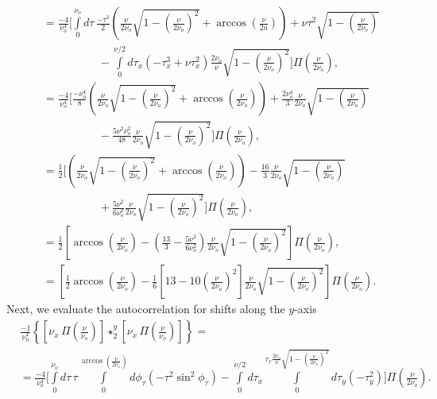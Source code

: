 \documentclass[11pt]{article}
\begin{document}
\begin{align}
  &=\frac{-4}{\nu_o^4}\Bigg[\int\limits_0^{\nu_o} d\tau\, \frac{-\tau^3}{2}\left(\frac{\nu}{2\nu_o}\sqrt{1 - \left(\frac{\nu}{2\nu_o}\right)^2} + \arccos\left(\frac{\nu}{2a}\right)\right) + \nu\tau^2\sqrt{1 - \left(\frac{\nu}{2\nu_o}\right)}\nonumber \\ &\hspace{5em}- \int\limits_0^{\nu/2}d\tau_x \left(-\tau_x^3 + \nu\tau_x^2\right)\frac{2 \nu_o}{\nu}\sqrt{1 - \left(\frac{\nu}{2\nu_o}\right)^2}\Bigg]\Pi\left(\frac{\nu}{2\nu_o}\right),\\
  &=  \frac{-4}{\nu_o^4}\Bigg[\frac{-\nu_o^4}{8}\left(\frac{\nu}{2\nu_o}\sqrt{1 - \left(\frac{\nu}{2\nu_o}\right)^2} + \arccos\left(\frac{\nu}{2\nu_o}\right) \right) + \frac{2\nu_o^4}{3}\frac{\nu}{2\nu_o}\sqrt{1 - \left(\frac{\nu}{2\nu_o}\right)}\nonumber \\ &\hspace{5em} - \frac{5\nu^2\nu_o^2}{48}\frac{\nu}{2\nu_o}\sqrt{1 - \left(\frac{\nu}{2\nu_o}\right)^2}\Bigg]\Pi\left(\frac{\nu}{2\nu_o}\right),\\
  &=  \frac{1}{2}\Bigg[\left(\frac{\nu}{2\nu_o}\sqrt{1 - \left(\frac{\nu}{2\nu_o}\right)^2} + \arccos\left(\frac{\nu}{2\nu_o}\right) \right) - \frac{16}{3}\frac{\nu}{2\nu_o}\sqrt{1 - \left(\frac{\nu}{2\nu_o}\right)}\nonumber \\ &\hspace{5em} + \frac{5\nu^2}{6\nu_o^2}\frac{\nu}{2\nu_o}\sqrt{1 - \left(\frac{\nu}{2\nu_o}\right)^2}\Bigg]\Pi\left(\frac{\nu}{2\nu_o}\right),\\
  &= \frac{1}{2}\left[\arccos\left(\frac{\nu}{2\nu_o}\right) - \left(\frac{13}{3} - \frac{5\nu^2}{6\nu_o^2}\right)\frac{\nu}{2\nu_o} \sqrt{1 - \left(\frac{\nu}{2\nu_o}\right)^2}\right]\Pi\left(\frac{\nu}{2\nu_o}\right),\\
  &= \left[\frac{1}{2}\arccos\left(\frac{\nu}{2\nu_o}\right) - \frac{1}{6}\left[13 - 10\left(\frac{\nu}{2\nu_o}\right)^2\right]\frac{\nu}{2\nu_o} \sqrt{1 - \left(\frac{\nu}{2\nu_o}\right)^2}\right]\Pi\left(\frac{\nu}{2\nu_o}\right).\label{eq:auto1}
\end{align}
Next, we evaluate the autocorrelation for shifts along the $y$-axis
\begin{align}
  &\frac{-1}{\nu_0^4}\left\{\left[\nu_x\, \Pi\left(\frac{\nu}{\nu_o}\right)\right] \star_2^y \left[\nu_x\, \Pi\left(\frac{\nu}{\nu_o}\right)\right]\right\} = \\
  &=  \frac{-4}{\nu_o^4}\Bigg[\int\limits_0^{\nu_o} d\tau\, \tau \int\limits_0^{\arccos\left(\frac{\nu}{2\nu_o}\right)}d\phi_{\tau}(-\tau^2\sin^2\phi_{\tau}) - \int\limits_0^{\nu/2}d\tau_x \int\limits_0^{\tau_x \frac{2\nu_o}{\nu}\sqrt{1 - \left(\frac{\nu}{2\nu_o}\right)^2}}d\tau_y(-\tau_y^2)\Bigg]\Pi\left(\frac{\nu}{2\nu_o}\right).
\end{align}
\end{document}
